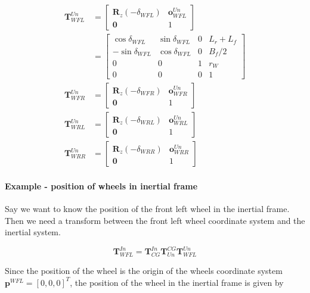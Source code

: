 \begin{align}
  \mathbf{T}_{WFL}^{Un} &= 
  \begin{bmatrix}
    \mathbf{R}_z(-\delta_{WFL}) & \mathbf{o}_{WFL}^{Un} \\
    \mathbf{0} & 1
  \end{bmatrix} \\
  &=
  \begin{bmatrix}
    \cos{\delta_{WFL}} & \sin{\delta_{WFL}} & 0 & L_r + L_f \\
    -\sin{\delta_{WFL}} & \cos{\delta_{WFL}} & 0 & B_f/2 \\
    0 & 0 & 1 & r_W \\
    0 & 0 & 0 & 1
  \end{bmatrix} \\
  \mathbf{T}_{WFR}^{Un} &= 
  \begin{bmatrix}
    \mathbf{R}_z(-\delta_{WFR}) & \mathbf{o}_{WFR}^{Un} \\
    \mathbf{0} & 1
  \end{bmatrix} \\
  \mathbf{T}_{WRL}^{Un} &= 
  \begin{bmatrix}
    \mathbf{R}_z(-\delta_{WRL}) & \mathbf{o}_{WRL}^{Un} \\
    \mathbf{0} & 1
  \end{bmatrix} \\
  \mathbf{T}_{WRR}^{Un} &= 
  \begin{bmatrix}
    \mathbf{R}_z(-\delta_{WRR}) & \mathbf{o}_{WRR}^{Un} \\
    \mathbf{0} & 1
  \end{bmatrix}
\end{align}


\paragraph{Example - position of wheels in inertial frame}

Say we want to know the position of the front left wheel in the inertial frame. Then we need a transform between the front left wheel coordinate system and the inertial system. 

\begin{equation}
  \mathbf{T}_{WFL}^{In} =
    \mathbf{T}_{CG}^{In} \mathbf{T}_{Un}^{CG} \mathbf{T}_{WFL}^{Un}
\end{equation}

Since the position of the wheel is the origin of the wheels coordinate system $\mathbf{p}^{WFL} = [0, 0, 0]^T$, the position of the wheel in the inertial frame is given by

